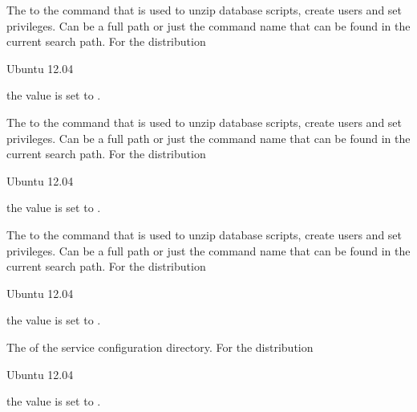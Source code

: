
The  to the  command that is used to unzip database scripts,
create users and set privileges. Can be a full path or
just the command name that can be found in the current search path. 
For the distribution
\begin{inparaitem}
\item[\TheDistribution{ubuntu}] Ubuntu 12.04
\end{inparaitem}
the value is set to .


The  to the  command that is used to unzip database scripts,
create users and set privileges. Can be a full path or
just the command name that can be found in the current search path. 
For the distribution
\begin{inparaitem}
\item[\TheDistribution{ubuntu}] Ubuntu 12.04
\end{inparaitem}
the value is set to .


The  to the  command that is used to unzip database scripts,
create users and set privileges. Can be a full path or
just the command name that can be found in the current search path. 
For the distribution
\begin{inparaitem}
\item[\TheDistribution{ubuntu}] Ubuntu 12.04
\end{inparaitem}
the value is set to .


The  of the service configuration directory.
For the distribution
\begin{inparaitem}
\item[\TheDistribution{ubuntu}] Ubuntu 12.04
\end{inparaitem}
the value is set to .

